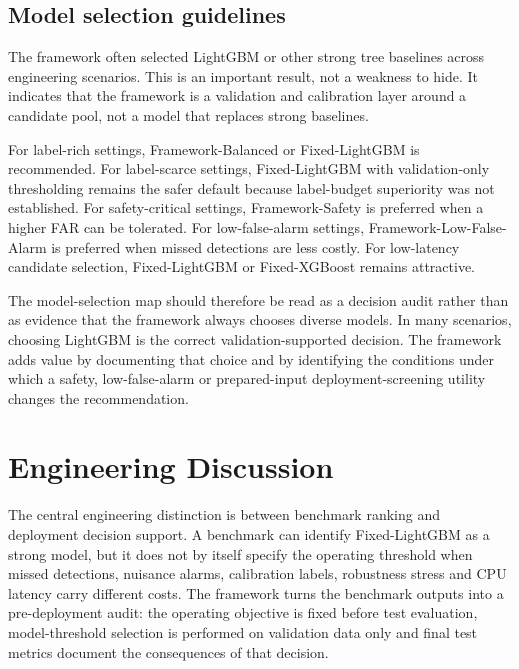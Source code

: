 \subsection{Model selection guidelines}



The framework often selected LightGBM or other strong tree baselines across engineering scenarios. This is an important result, not a weakness to hide. It indicates that the framework is a validation and calibration layer around a candidate pool, not a model that replaces strong baselines.



For label-rich settings, Framework-\allowbreak Balanced or Fixed-\allowbreak LightGBM is recommended. For label-scarce settings, Fixed-\allowbreak LightGBM with validation-only thresholding remains the safer default because label-budget superiority was not established. For safety-critical settings, Framework-\allowbreak Safety is preferred when a higher FAR can be tolerated. For low-false-alarm settings, Framework-\allowbreak Low-\allowbreak False-\allowbreak Alarm is preferred when missed detections are less costly. For low-latency candidate selection, Fixed-\allowbreak LightGBM or Fixed-\allowbreak XGBoost remains attractive.

The model-selection map should therefore be read as a decision audit rather than as evidence that the framework always chooses diverse models. In many scenarios, choosing LightGBM is the correct validation-supported decision. The framework adds value by documenting that choice and by identifying the conditions under which a safety, low-false-alarm or prepared-input deployment-screening utility changes the recommendation.










\section{Engineering Discussion}

The central engineering distinction is between benchmark ranking and deployment decision support. A benchmark can identify Fixed-\allowbreak LightGBM as a strong model, but it does not by itself specify the operating threshold when missed detections, nuisance alarms, calibration labels, robustness stress and CPU latency carry different costs. The framework turns the benchmark outputs into a pre-deployment audit: the operating objective is fixed before test evaluation, model-threshold selection is performed on validation data only and final test metrics document the consequences of that decision.

